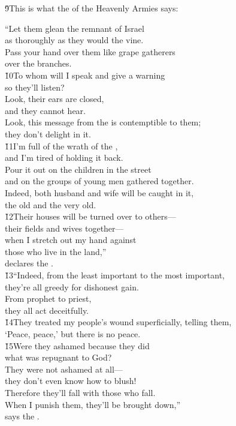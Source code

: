 \v{9}This is what the  of the Heavenly Armies says:

\begin{poetry}
\poeml ``Let them glean the remnant of Israel \\
\poemll    as thoroughly as they would the vine. \\
\poeml Pass your hand over them like grape gatherers \\
\poemll    over the branches. \\
\poeml \v{10}To whom will I speak and give a warning \\
\poemll    so they'll listen? \\
\poeml Look, their ears are closed, \\
\poemll    and they cannot hear. \\
\poeml Look, this message from the  is contemptible to them; \\
\poemll    they don't delight in it. \\
\poeml \v{11}I'm full of the wrath of the , \\
\poemll    and I'm tired of holding it back. \\
\poeml Pour it out on the children in the street \\
\poemll    and on the groups of young men gathered together. \\
\poeml Indeed, both husband and wife will be caught in it, \\
\poemll    the old and the very old. \\
\poeml \v{12}Their houses will be turned over to others--- \\
\poemll    their fields and wives together--- \\
\poeml when I stretch out my hand against \\
\poemll    those who live in the land,'' \\
\poemlll       declares the . \\
\poeml \v{13}``Indeed, from the least important to the most important, \\
\poemll    they're all greedy for dishonest gain. \\
\poeml From prophet to priest, \\
\poemll    they all act deceitfully. \\
\poeml \v{14}They treated my people's wound superficially, telling them, \\
\poemll    `Peace, peace,' but there is no peace. \\
\poeml \v{15}Were they ashamed because they did \\
\poemll    what was repugnant to God? \\
\poeml They were not ashamed at all--- \\
\poemll    they don't even know how to blush! \\
\poeml Therefore they'll fall with those who fall. \\
\poemll    When I punish them, they'll be brought down,'' \\
\poemlll       says the .
\end{poetry}
